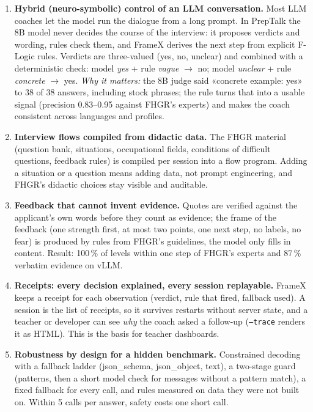 \documentclass[10pt,a4paper]{article}
\begin{document}
\begin{enumerate}[leftmargin=1.4em,itemsep=3pt]
\item \textbf{Hybrid (neuro-symbolic) control of an LLM conversation.} Most LLM coaches let the model run the dialogue from a long
prompt. In PrepTalk the 8B model never decides the course of the interview: it proposes verdicts and wording, rules check them, and FrameX
derives the next step from explicit F-Logic rules. Verdicts are three-valued (yes, no, unclear) and combined with a deterministic check:
model \emph{yes} + rule \emph{vague} $\rightarrow$ no; model \emph{unclear} + rule \emph{concrete} $\rightarrow$ yes.
\emph{Why it matters:} the 8B judge said «concrete example: yes» to 38 of 38 answers, including stock phrases; the rule turns that into a
usable signal (precision 0.83--0.95 against FHGR's experts) and makes the coach consistent across languages and profiles.

\item \textbf{Interview flows compiled from didactic data.} The FHGR material (question bank, situations, occupational fields, conditions
of difficult questions, feedback rules) is compiled per session into a flow program. Adding a situation or a question means adding data,
not prompt engineering, and FHGR's didactic choices stay visible and auditable.

\item \textbf{Feedback that cannot invent evidence.} Quotes are verified against the applicant's own words before they count as evidence;
the frame of the feedback (one strength first, at most two points, one next step, no labels, no fear) is produced by rules from FHGR's
guidelines, the model only fills in content. Result: 100\,\% of levels within one step of FHGR's experts and 87\,\% verbatim evidence on vLLM.

\item \textbf{Receipts: every decision explained, every session replayable.} FrameX keeps a receipt for each observation (verdict, rule that
fired, fallback used). A session is the list of receipts, so it survives restarts without server state, and a teacher or developer can see
\emph{why} the coach asked a follow-up (\texttt{--trace} renders it as HTML). This is the basis for teacher dashboards.

\item \textbf{Robustness by design for a hidden benchmark.} Constrained decoding with a fallback ladder (json\_schema, json\_object, text),
a two-stage guard (patterns, then a short model check for messages without a pattern match), a fixed fallback for every call, and rules
measured on data they were not built on. Within 5 calls per answer, safety costs one short call.


\end{enumerate}
\end{document}
